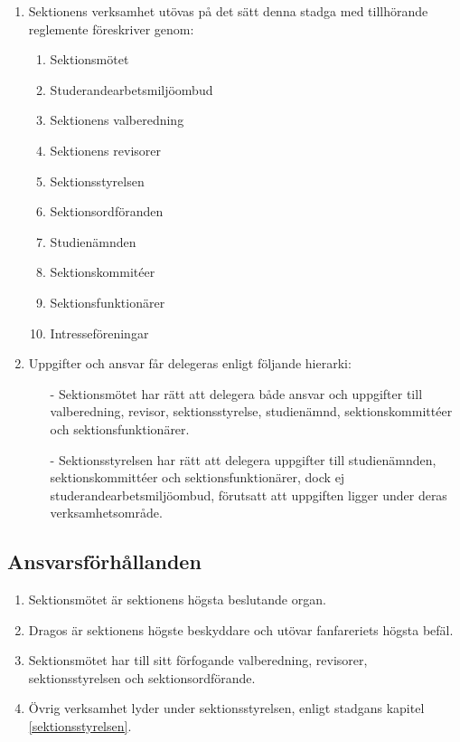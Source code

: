 \documentclass[11pt,a4paper]{article}
\begin{document}
\begin{enumerate}[\thesubsection .1]

   \item Sektionens verksamhet ut\-övas på det sätt denna stadga med
   till\-hör\-ande regle\-mente föreskriver genom:
      \begin{enumerate}[1]
         \item Sektionsmötet
         \item Studerandearbetsmiljöombud
         \item Sektionens valberedning
         \item Sektionens revisorer
         \item Sektionsstyrelsen
	 	 \item Sektionsordföranden
         \item Studienämnden
         \item Sektionskommitéer
         \item Sektionsfunktionärer
         \item Intresseföreningar
      \end{enumerate}

	\item Uppgifter och ansvar får delegeras enligt följande hierarki:
		\begin{enumerate}
			\item[-] Sektionsmötet har rätt att delegera både ansvar och uppgifter till valberedning, revisor, sektionsstyrelse, studienämnd, sektionskommittéer och sektionsfunktionärer.
			\item[-] Sektionsstyrelsen har rätt att delegera uppgifter till studienämnden,  sektionskommittéer och sektionsfunktionärer, dock ej studerandearbetsmiljöombud, förutsatt att uppgiften ligger under deras verksamhetsområde.
		\end{enumerate}

\end{enumerate}

\subsection{Ansvarsförhållanden}

\begin{enumerate}[\thesubsection .1]

   \item Sektionsmötet är sektionens högsta beslutande organ.

   \item Dragos är sektionens högste beskyddare och utövar
   fanfareriets högsta befäl.

   \item Sektionsmötet har till sitt förfogande valberedning,
   revisorer, sektionsstyrelsen och sektionsordförande.

   \item Övrig verksamhet lyder under sektionsstyrelsen, enligt stadgans kapitel \ref{sektionsstyrelsen}.

\end{enumerate}
\end{document}
